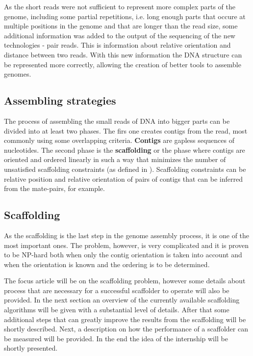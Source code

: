\documentclass[11pt]{article}
\begin{document}
As the short reads were not sufficient to represent more complex parts of the
genome, including some partial repetitions, i.e. long enough parts that occure at
multiple positions in the genome and that are longer than the read size, some additional information was
added to the output of the sequencing of the new technologies - pair reads. This
is information about relative orientation and distance between two reads. With
this new information the DNA structure can be represented more correctly,
allowing the creation of better tools to assemble genomes.


\subsection{Assembling strategies}
\label{sub:Assembling strategies}
The process of assembling the small reads of DNA into bigger parts can be
divided into at least two phases. The firs one creates contigs from the read,
most commonly using some overlapping criteria. \textbf{Contigs} are gapless
sequences of nucleotides. The second phase is the \textbf{scaffolding} or the
phase where contigs are oriented and ordered linearly in such a way that
minimizes the number of unsatisfied scaffolding constraints (as defined in
\cite{grass}). Scaffolding constraints can be relative position and relative
orientation of pairs of contigs that can be inferred from the mate-pairs, for
example.

\subsection{Scaffolding}
\label{sub:Scaffolding}
As the scaffolding is the last step in the genome assembly process, it is one of
the most important ones. The problem, however, is very complicated and it is proven 
to be NP-hard both when only the contig orientation is taken into account and  
when the orientation is known and the ordering is to be determined. 

The focus article will be on the scaffolding problem, however some details about
process that are necessary for a successful scaffolder to operate will also be
provided. In the next section an overview of the currently available scaffolding
algorithms will be given with a substantial level of details. After that some
additional steps that can greatly improve the results from the scaffolding will
be shortly described. Next, a description on how the performance of a scaffolder
can be measured will be provided. In the end the idea of the internship will be
shortly presented.
\end{document}
